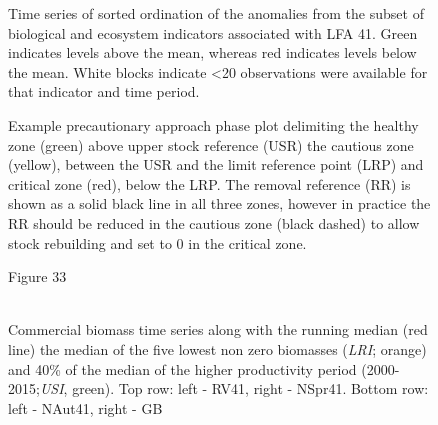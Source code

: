 \documentclass[11pt]{article}
\newcommand{\D}{.}
\newcommand{\e}{/backup/bio_data/bio.lobster/figures/} %
\begin{document}
\begin{figure}

    
    \caption{Time series of sorted ordination of the anomalies from the subset of biological and ecosystem indicators associated with LFA 41. Green indicates levels above the mean, whereas red indicates levels below the mean. White blocks indicate \textless 20 observations were available for that indicator and time period.}

\end{figure}



\begin{figure}
\centering
    \caption{Example precautionary approach phase plot delimiting the healthy zone (green) above upper stock reference (USR) the cautious zone (yellow), between the USR and the limit reference point (LRP) and critical zone (red), below the LRP. The removal reference (RR) is shown as a solid black line in all three zones, however in practice the RR should be reduced in the cautious zone (black dashed) to allow stock rebuilding and set to 0 in the critical zone.
}

\end{figure}


\begin{landscape}
\begin{figure}
\centering
        {Figure 33}\\
        \\
      
       \caption{Commercial biomass time series along with the running median (red line) the median of the five lowest non zero biomasses (\emph{LRI}; orange) and 40\% of the median of the higher productivity period (2000-2015;\emph{USI}, green). Top row: left - RV41, right - NSpr41. Bottom row: left - NAut41, right - GB}

\end{figure}
\end{landscape}
\end{document}
